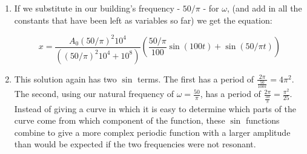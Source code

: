 \documentclass[11pt,answers]{exam}
\begin{document}
\begin{questions}
\begin{solution}
\begin{enumerate}
\item If we substitute in our building's frequency - $50/\pi$ - for $\omega$, (and add in all the constants that have been left as variables so far) we get the equation:

\[
x = \frac{A_0 (50/\pi)^2 10^4}{((50/\pi)^2 10^4 + 10^8)}\left(\frac{50/\pi}{100}\sin{(100t)} + \sin{(50/\pi t)}\right)
\]

\item This solution again has two $\sin$ terms. The first has a period of $\frac{2\pi}{\frac{50}{100\pi}} = 4\pi^{2}$. The second, using our natural frequency of $\omega = \frac{50}{\pi}$, has a period of $\frac{2\pi}{\frac{50}{\pi}} = \frac{\pi^{2}}{25}$. Instead of giving a curve in which it is easy to determine which parts of the curve come from which component of the function, these $\sin$ functions combine to give a more complex periodic function with a larger amplitude than would be expected if the two frequencies were not resonant.
\end{enumerate}


\end{solution}
\end{questions}
\end{document}
